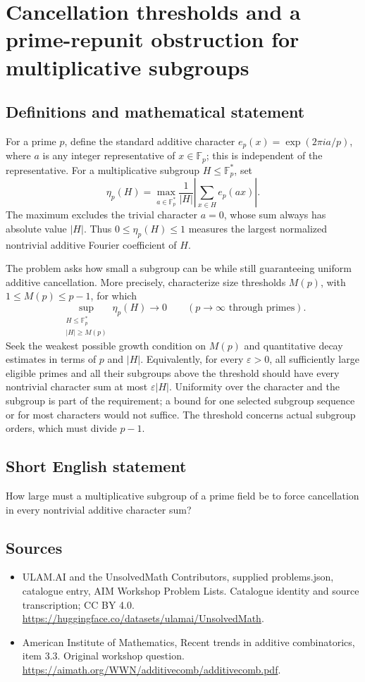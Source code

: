 \documentclass[11pt,a4paper]{article}
\begin{document}
\section*{Cancellation thresholds and a prime-repunit obstruction for multiplicative subgroups}\label{statement}

\subsection{Definitions and mathematical statement}
For a prime $p$, define the standard additive character
$e_p(x)=\exp(2\pi i a/p)$, where $a$ is any integer representative of $x\in\mathbb F_p$; this is independent of the representative.
For a multiplicative subgroup $H\leq\mathbb F_p^*$, set
\[
 \eta_p(H)=\max_{a\in\mathbb F_p^*}
       \frac1{|H|}\left|\sum_{x\in H}e_p(ax)\right|.
\]
The maximum excludes the trivial character $a=0$, whose sum always has absolute value $|H|$.
Thus $0\leq\eta_p(H)\leq1$ measures the largest normalized nontrivial additive Fourier coefficient of $H$.

The problem asks how small a subgroup can be while still guaranteeing uniform additive cancellation.
More precisely, characterize size thresholds $M(p)$, with $1\leq M(p)\leq p-1$, for which
\[
 \sup_{\substack{H\leq\mathbb F_p^*\\|H|\geq M(p)}}
          \eta_p(H)\longrightarrow0
       \qquad(p\to\infty\text{ through primes}).
\]
Seek the weakest possible growth condition on $M(p)$ and quantitative decay estimates in terms of $p$ and $|H|$.
Equivalently, for every $\varepsilon>0$, all sufficiently large eligible primes and all their subgroups above the threshold should have every nontrivial character sum at most $\varepsilon|H|$.
Uniformity over the character and the subgroup is part of the requirement; a bound for one selected subgroup sequence or for most characters would not suffice.
The threshold concerns actual subgroup orders, which must divide $p-1$.
\subsection{Short English statement}
How large must a multiplicative subgroup of a prime field be to force cancellation in every nontrivial additive character sum?
\subsection{Sources}
\begin{itemize}
\item[S1] ULAM.AI and the UnsolvedMath Contributors, supplied problems.json, catalogue entry, AIM Workshop Problem Lists. Catalogue identity and source transcription; CC BY 4.0.
\url{https://huggingface.co/datasets/ulamai/UnsolvedMath}.
\item[S2] American Institute of Mathematics, Recent trends in additive combinatorics, item 3.3. Original workshop question.
\url{https://aimath.org/WWN/additivecomb/additivecomb.pdf}.
\end{itemize}
\end{document}
